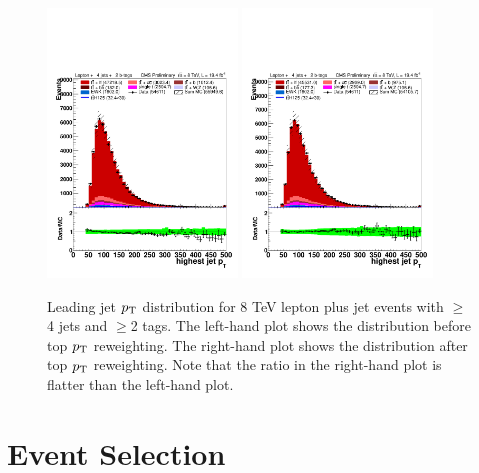 \begin{figure}[hbtp]
 \begin{center}
   \includegraphics[width=0.45\textwidth]{Figures/Analysis_2_Diagrams/LJ_plots_lep/4j2t/lep_jet_pt_1_noTopPt_4j2t_cumulative_wRatio_lin.pdf}
   \includegraphics[width=0.45\textwidth]{Figures/Analysis_2_Diagrams/LJ_plots_lep/4j2t/lep_jet_pt_1_4j2t_cumulative_wRatio_lin.pdf}
   \caption{Leading jet $p_{\mathrm{T}}$ distribution for 8 TeV lepton plus jet events with
   $\geq$4 jets and $\geq$2 tags. The left-hand plot shows the
   distribution before top $p_{\mathrm{T}}$ reweighting. The right-hand plot shows the
   distribution after top $p_{\mathrm{T}}$ reweighting. Note that the ratio in the right-hand
   plot is flatter than the left-hand plot.}
   \label{fig:topPtBeforeAfter}
   \end{center}
\end{figure}


\section{Event Selection}
\label{event_selection_II_overview}


